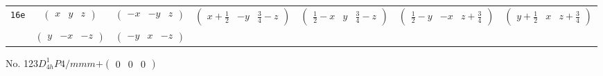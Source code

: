 \documentclass[fleqn,9pt,landscape]{jsarticle}
\begin{document}
\begin{center}
\begin{longtable}{ccccccc}
{\tt 16e} & $ \begin{pmatrix} x & y & z \end{pmatrix} $ & $ \begin{pmatrix} - x & - y & z \end{pmatrix} $ & $ \begin{pmatrix} x + \frac{1}{2} & - y & \frac{3}{4} - z \end{pmatrix} $ & $ \begin{pmatrix} \frac{1}{2} - x & y & \frac{3}{4} - z \end{pmatrix} $ & $ \begin{pmatrix} \frac{1}{2} - y & - x & z + \frac{3}{4} \end{pmatrix} $ & $ \begin{pmatrix} y + \frac{1}{2} & x & z + \frac{3}{4} \end{pmatrix} $ \\
& $ \begin{pmatrix} y & - x & - z \end{pmatrix} $ & $ \begin{pmatrix} - y & x & - z \end{pmatrix} $ & $  $ & $  $ & $  $ & $  $ \\
\end{longtable}
\end{center}
\newpage
No. 123\quad$D_{4h}^{1}$\quad$P4/mmm$\quad[ tetragonal ]\quad$+\begin{pmatrix} 0 & 0 & 0 \end{pmatrix}$
\end{document}
